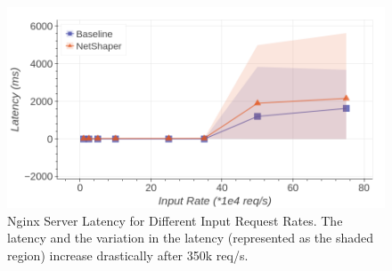 \begin{figure}[!htb]
    \centering
    \includegraphics[width=0.8\columnwidth]{figures/netshaper/evaluation/http_reqs_latency.png}
    \caption{Nginx Server Latency for Different Input Request Rates. 
    The latency and the variation in the latency (represented as the shaded region) increase drastically after 350k req/s.}
    \label{fig:netshaper-eval-http-reqs-latency}
\end{figure}